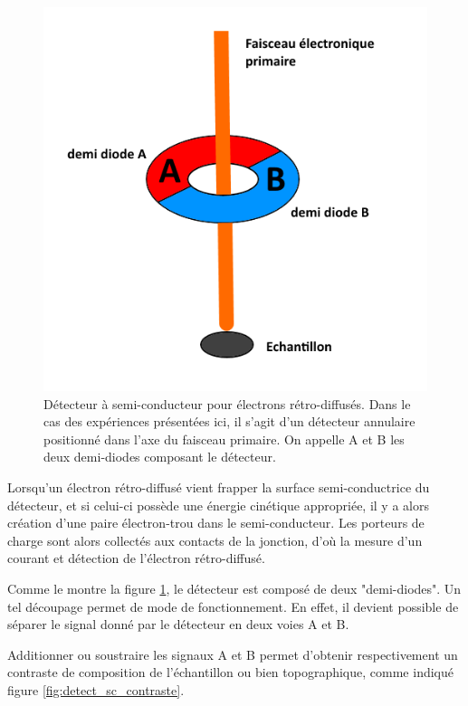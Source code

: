 \documentclass[a4paper,12pt]{article}
\begin{document}
\begin{figure}
\centering
\includegraphics[width = 0.6 \textwidth]{images/detect_sc.png}
\caption{Détecteur à semi-conducteur pour électrons rétro-diffusés. Dans le cas des expériences présentées ici, il s'agit d'un détecteur annulaire positionné dans l'axe du faisceau primaire. On appelle A et B les deux demi-diodes composant le détecteur.}
\label{fig:detect_sc}
\end{figure}


Lorsqu'un électron rétro-diffusé vient frapper la surface semi-conductrice du détecteur, 
et si celui-ci possède une énergie cinétique appropriée,
il y a alors création d'une paire électron-trou dans le semi-conducteur. 
Les porteurs de charge sont alors collectés aux contacts de la jonction, d'où la mesure d'un courant et détection de l'électron rétro-diffusé.

Comme le montre la figure \ref{fig:detect_sc}, le détecteur est composé de deux "demi-diodes".
Un tel découpage permet de mode de fonctionnement.
En effet, il devient possible de séparer le signal donné par le détecteur en deux voies A et B.

Additionner ou soustraire les signaux A et B permet d'obtenir respectivement un contraste de composition de l'échantillon ou bien topographique, comme indiqué figure \ref{fig:detect_sc_contraste}.
\end{document}
